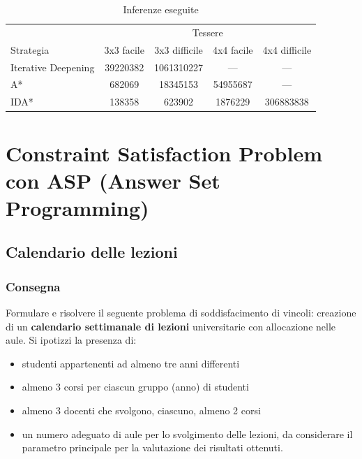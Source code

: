 \documentclass[a4paper,oneside,12pt]{book}
\begin{document}
    \begin{table}
        \centering
        \begin{tabular}{l c c c c}
            \toprule %
            & \multicolumn{4}{c}{Tessere} \\ %
            \cmidrule(l){2-5} %
            Strategia & 3x3 facile & 3x3 difficile & 4x4 facile & 4x4 difficile\\ %
            \midrule %
            Iterative Deepening
            & \num{39220382}& \num{1061310227} & --- & --- \\ %
            A*
            & \num{682069} & \num{18345153} & \num{54955687	} & --- \\ %
            IDA*
            & \num{138358} & \num{623902} & \num{1876229} & \num{306883838}\\ %
            \bottomrule
        \end{tabular}
        \caption{Inferenze eseguite}
    \end{table}
    \FloatBarrier
    \restoregeometry
    \section*{Constraint Satisfaction Problem con ASP (Answer Set Programming)}
    \subsection*{Calendario delle lezioni}
    \subsubsection{Consegna}
    Formulare e risolvere il seguente problema di soddisfacimento
    di vincoli:
    creazione di un \textbf{calendario settimanale di lezioni} universitarie con
    allocazione nelle aule. Si ipotizzi la presenza di:
    \begin{itemize}
        \item studenti appartenenti ad almeno tre anni differenti
        \item almeno 3 corsi per ciascun gruppo (anno) di studenti
        \item almeno 3 docenti che svolgono, ciascuno, almeno 2
        corsi
        \item un numero adeguato di aule per lo svolgimento delle
        lezioni, da considerare il parametro principale per la
        valutazione dei risultati ottenuti.
    \end{itemize}
\end{document}

